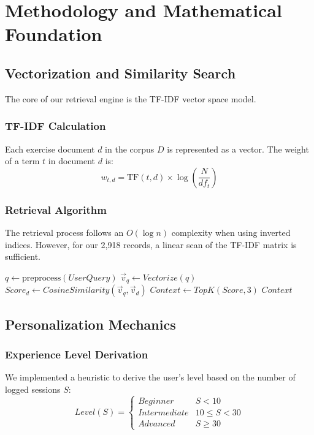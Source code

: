 \documentclass[12pt,a4paper]{report}
\begin{document}
\chapter{Methodology and Mathematical Foundation}

\section{Vectorization and Similarity Search}
The core of our retrieval engine is the TF-IDF vector space model.
\subsection{TF-IDF Calculation}
Each exercise document $d$ in the corpus $D$ is represented as a vector. The weight of a term $t$ in document $d$ is:
\begin{equation}
w_{t,d} = \text{TF}(t,d) \times \log\left(\frac{N}{df_t}\right)
\end{equation}

\subsection{Retrieval Algorithm}
The retrieval process follows an $O(\log n)$ complexity when using inverted indices. However, for our 2,918 records, a linear scan of the TF-IDF matrix is sufficient.
\begin{algorithm}
\caption{Retrieval Procedure}
\begin{algorithmic}
\STATE $q \leftarrow \text{preprocess}(UserQuery)$
\STATE $\vec{v}_q \leftarrow Vectorize(q)$
\STATE $Score_d \leftarrow CosineSimilarity(\vec{v}_q, \vec{v}_d)$
\ENDFOR
\STATE $Context \leftarrow TopK(Score, 3)$
\RETURN $Context$
\end{algorithmic}
\end{algorithm}

\section{Personalization Mechanics}
\subsection{Experience Level Derivation}
We implemented a heuristic to derive the user's level based on the number of logged sessions $S$:
\begin{equation}
Level(S) = \begin{cases} Beginner & S < 10 \\ Intermediate & 10 \leq S < 30 \\ Advanced & S \geq 30 \end{cases}
\end{equation}
\end{document}

